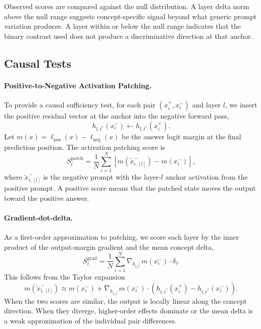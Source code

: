 Observed scores are compared against the null distribution.  A layer delta norm
above the null range suggests concept-specific signal beyond what generic
prompt variation produces.  A layer within or below the null range indicates
 that the binary contrast used
does not produce a discriminative direction at that anchor.

\subsection{Causal Tests}
\label{sec:causal_validation}

\paragraph{Positive-to-Negative Activation Patching.}

To provide a causal sufficiency test, for each pair \((x_i^+,x_i^-)\) and
layer \(l\), we insert the positive residual vector at the anchor into the
negative forward pass,
\[
h_{l,t^*}(x_i^-) \leftarrow h_{l,t^*}(x_i^+).
\]
Let \(m(x)=\ell_{\mathrm{pos}}(x)-\ell_{\mathrm{neg}}(x)\) be the answer logit
margin at the final prediction position. The activation patching score is
\begin{equation}
S_l^{\mathrm{patch}}
=
\frac{1}{N}\sum_{i=1}^{N}
\left[m\!\left(\tilde{x}_{i,[l]}^-\right)-m(x_i^-)\right],
\label{eq:patch_score}
\end{equation}
where \(\tilde{x}_{i,[l]}^-\) is the negative prompt with the layer-\(l\) anchor
activation from the positive prompt. A positive score means that the
patched state moves the output toward the positive answer.

\paragraph{Gradient-dot-delta.}

As a first-order approximation to patching, we score each layer by the
inner product of the output-margin gradient and the mean concept delta,
\begin{equation}
S_l^{\mathrm{grad}}
=
\frac{1}{N}\sum_{i=1}^{N}
\nabla_{h_{l,t^*}}m(x_i^- )\cdot\delta_l.
\label{eq:grad_delta_score}
\end{equation}
This follows from the Taylor expansion
\begin{equation}
m(\tilde{x}_{i,[l]}^-)
\approx
m(x_i^-)
+
\nabla_{h_{l,t^*}}m(x_i^-)
\cdot
\left(h_{l,t^*}(x_i^+) - h_{l,t^*}(x_i^-)\right).
\label{eq:patch_taylor}
\end{equation}
When the two scores are similar, the output is locally linear along the concept
direction.  When they diverge, higher-order effects dominate or the mean
delta is a weak approximation of the individual pair differences.

